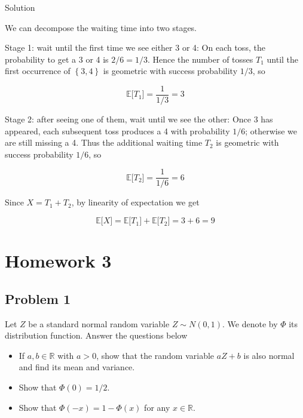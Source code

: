 \documentclass{qlnotes-export}
\begin{document}
\begin{qlsolution}{Solution}

We can decompose the waiting time into two stages.

Stage 1: wait until the first time we see either 3 or 4: On each toss, the probability to get a 3 or 4 is \(2/6 = 1/3\). Hence the number of tosses \(T_{1}\) until the first occurrence of \(\left\{ {3,4} \right\}\) is geometric with success probability \(1/3\), so

\[{\mathbb{E}}\lbrack T_{1}\rbrack = \frac{1}{1/3} = 3\]

Stage 2: after seeing one of them, wait until we see the other: Once 3 has appeared, each subsequent toss produces a 4 with probability \(1/6\); otherwise we are still missing a 4. Thus the additional waiting time \(T_{2}\) is geometric with success probability \(1/6\), so

\[{\mathbb{E}}\lbrack T_{2}\rbrack = \frac{1}{1/6} = 6\]

Since \(X = T_{1} + T_{2}\), by linearity of expectation we get

\[{\mathbb{E}}\lbrack X\rbrack = {\mathbb{E}}\lbrack T_{1}\rbrack + {\mathbb{E}}\lbrack T_{2}\rbrack = 3 + 6 = 9\]

\end{qlsolution}

\chapter{Homework 3}\label{homework-3}

\section{Problem 1}\label{problem-1-3}

Let \(Z\) be a standard normal random variable \(Z \sim N(0,1)\). We denote by \(\Phi\) its distribution function. Answer the questions below

\begin{itemize}
\item
  If \(a,b \in {\mathbb{R}}\) with \(a > 0\), show that the random variable \(aZ + b\) is also normal and find its mean and variance.
\item
  Show that \(\Phi(0) = 1/2\).
\item
  Show that \(\Phi( - x) = 1 - \Phi(x)\) for any \(x \in {\mathbb{R}}\).
\end{itemize}
\end{document}
